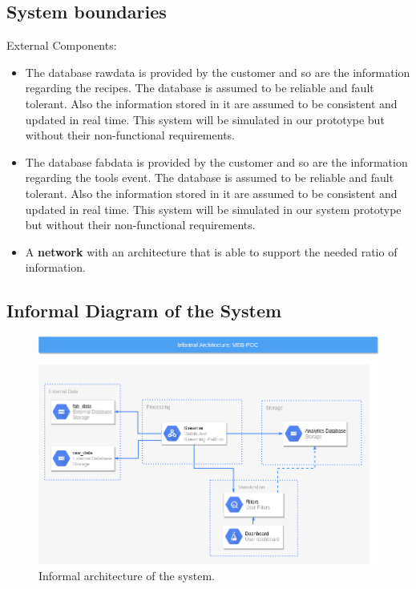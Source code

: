 \subsection{System boundaries}
External Components:
\begin{itemize}
    \item The database raw\textunderscore data is provided by the customer and so are the information regarding the recipes. The database is assumed to be reliable and fault tolerant. Also the information stored in it are assumed to be consistent and updated in real time. This system will be simulated in our prototype but without their non-functional requirements.
    \item The database fab\textunderscore data is provided by the customer and so are the information regarding the tools event. The database is assumed to be reliable and fault tolerant. Also the information stored in it are assumed to be consistent and updated in real time. This system will be simulated in our system prototype but without their non-functional requirements.
    \item A \textbf{network} with an architecture that is able to support the needed ratio of information. 
\end{itemize}

\subsection{Informal Diagram of the System}

\begin{figure}[H]
\centering
\includegraphics[width=\textwidth]{img/InformalDiagram.png}
\caption{Informal architecture of the system.}
\end{figure}

